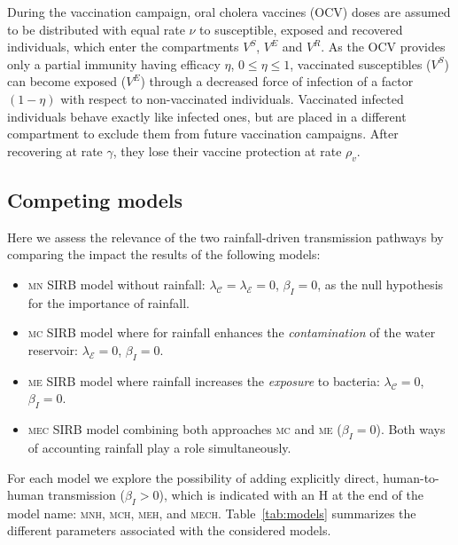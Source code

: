 During the vaccination campaign, oral cholera vaccines (OCV) doses are assumed to be distributed with equal rate $\nu$ to susceptible, exposed and recovered individuals, which enter the compartments $V^S$, $V^E$ and $V^R$. As the OCV provides only a partial immunity having efficacy $\eta$, $0\leq \eta \leq 1$, vaccinated susceptibles ($V^S$) can become exposed ($V^E$) through a decreased force of infection of a factor $(1-\eta)$ with respect to non-vaccinated individuals. Vaccinated infected individuals behave exactly like infected ones, but are placed in a different compartment to exclude them from future vaccination campaigns. After recovering at  rate $\gamma$, they lose their vaccine protection at rate $\rho_{v}$.


\subsection{Competing models}
Here we assess the relevance of the two rainfall-driven transmission pathways by comparing the impact the results of the following models:
\begin{itemize}
 \item \textsc{mn} SIRB model without rainfall: $\lambda_{\mathcal{C}} = \lambda_{\mathcal{E}} = 0$, $\beta_{I} = 0$, as the null hypothesis for the importance of rainfall.
  \item \textsc{mc} SIRB model where for rainfall enhances the \textit{contamination} of the water reservoir: $\lambda_{\mathcal{E}} = 0$, $\beta_{I} = 0$. 
  \item \textsc{me} SIRB model where rainfall increases the \textit{exposure} to bacteria: $\lambda_{\mathcal{C}} = 0$, $\beta_{I} = 0$. 
  \item \textsc{mec} SIRB model combining both approaches \textsc{mc} and \textsc{me} ($\beta_{I} = 0$). Both ways of accounting rainfall play a role simultaneously.
\end{itemize}

 For each model we explore the possibility of adding explicitly direct, human-to-human transmission ($\beta_{I} > 0$), which is indicated with an \textsc{H} at the end of the model name: \textsc{mnh}, \textsc{mch}, \textsc{meh}, and \textsc{mech}. Table~\ref{tab:models} summarizes the different parameters associated with the considered models.

